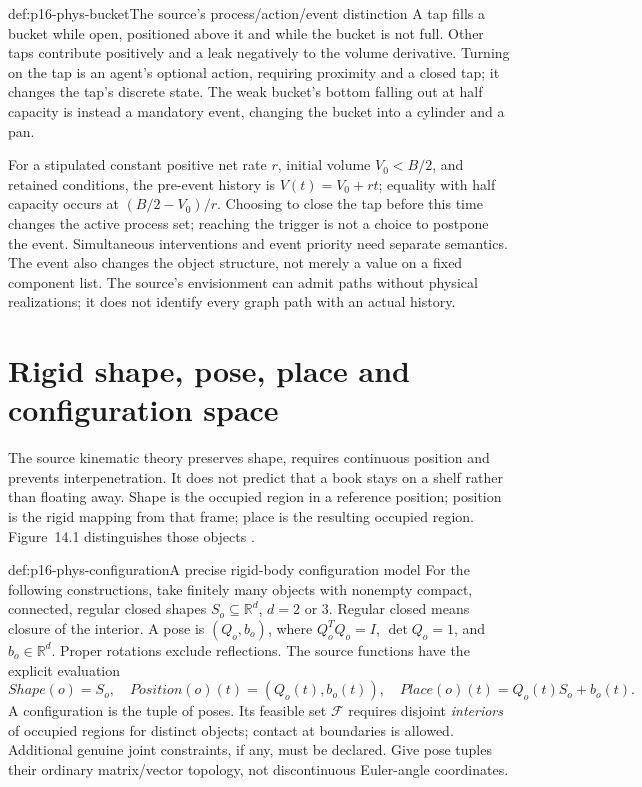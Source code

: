 \begin{hbexample}{def:p16-phys-bucket}{The source's process/action/event distinction}
A tap fills a bucket while open, positioned above it and while the bucket
is not full. Other taps contribute positively and a leak negatively to
the volume derivative. Turning on the tap is an agent's optional action,
requiring proximity and a closed tap; it changes the tap's discrete state.
The weak bucket's bottom falling out at half capacity is instead a mandatory
event, changing the bucket into a cylinder and a pan.

For a stipulated constant positive net rate \(r\), initial volume
\(V_0<B/2\), and retained conditions, the pre-event history is
\(V(t)=V_0+rt\); equality with half capacity occurs at
\((B/2-V_0)/r\). Choosing to close the tap before this time changes the
active process set; reaching the trigger is not a choice to postpone the
event. Simultaneous interventions and event priority need separate semantics.
The event also changes the object structure, not merely a value on a fixed
component list. The source's envisionment can admit paths without physical
realizations; it does not identify every graph path with an actual history.
\end{hbexample}

\section{Rigid shape, pose, place and configuration space}
\label{sec:p16-phys-kinematics}

The source kinematic theory preserves shape, requires continuous position
and prevents interpenetration. It does not predict that a book stays on
a shelf rather than floating away. Shape is the occupied region in a
reference position; position is the rigid mapping from that frame; place
is the resulting occupied region. Figure~14.1 distinguishes those objects
\cite[pp.~603--605]{Davis2008PhysicalReasoning}.

\begin{hbdefinition}{def:p16-phys-configuration}{A precise rigid-body configuration model}
For the following constructions, take finitely many objects with nonempty
compact, connected, regular closed shapes \(S_o\subseteq\mathbb R^d\),
\(d=2\) or \(3\). Regular closed means closure of the interior.
A pose is \((Q_o,b_o)\), where \(Q_o^TQ_o=I\), \(\det Q_o=1\),
and \(b_o\in\mathbb R^d\). Proper rotations exclude reflections.
The source functions have the explicit evaluation
\[
 Shape(o)=S_o,\quad Position(o)(t)=(Q_o(t),b_o(t)),\quad
 Place(o)(t)=Q_o(t)S_o+b_o(t).
\]
A configuration is the tuple of poses. Its feasible set \(\mathcal F\)
requires disjoint \emph{interiors} of occupied regions for distinct objects;
contact at boundaries is allowed. Additional genuine joint constraints,
if any, must be declared. Give pose tuples their ordinary matrix/vector
topology, not discontinuous Euler-angle coordinates.
\end{hbdefinition}

